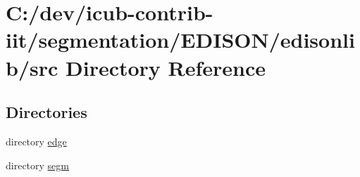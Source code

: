 \section{C\+:/dev/icub-\/contrib-\/iit/segmentation/\+E\+D\+I\+S\+O\+N/edisonlib/src Directory Reference}
\label{dir_4e515d1d9f97f297dc161aad76a24e4c}
\subsection*{Directories}
\begin{DoxyCompactItemize}
\item 
directory \hyperlink{dir_a850469184cc141cb5a86c96c4a2639d}{edge}
\item 
directory \hyperlink{dir_eada60fe3d29503381d0e05be82fd90f}{segm}
\end{DoxyCompactItemize}
